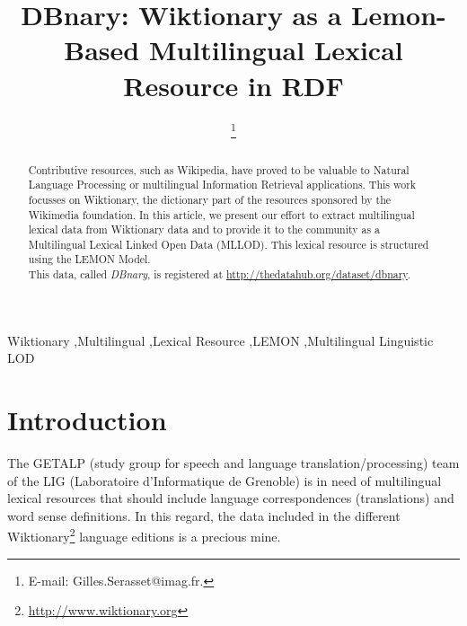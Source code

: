 \documentclass[sw]{iosart2c}
\begin{document}
\begin{frontmatter}

\title{DBnary: Wiktionary as a Lemon-Based Multilingual Lexical Resource in RDF}



\author{ \thanks{E-mail: Gilles.Serasset@imag.fr.}}
\address{GETALP-LIG, UJF-Grenoble 1 \\BP 53, 38051 Grenoble cedex 9, France\\ \texttt{gilles.serasset@imag.fr}}


\begin{abstract}
Contributive resources, such as Wikipedia, have proved to be valuable to Natural Language Processing or multilingual Information Retrieval applications. This work focusses on Wiktionary, the dictionary part of the resources sponsored by the Wikimedia foundation. In this article, we present our effort to extract multilingual lexical data from Wiktionary data and to provide it to the community as a Multilingual Lexical Linked Open Data (MLLOD). This lexical resource is structured using the LEMON Model.\\
This data, called \textit{DBnary}, is registered at \url{http://thedatahub.org/dataset/dbnary}.
\end{abstract}

\begin{keyword}
Wiktionary \sep Multilingual \sep Lexical Resource \sep LEMON \sep Multilingual Linguistic LOD
\end{keyword}

\end{frontmatter}

\section{Introduction}

The GETALP (study group for speech and language translation/processing) team of the LIG (Laboratoire d'Informatique de Grenoble) is in need of multilingual lexical resources that should include language correspondences (translations) and word sense definitions. In this regard, the data included in the different Wiktionary\footnote{\url{http://www.wiktionary.org}} language editions is a precious mine.
\end{document}
